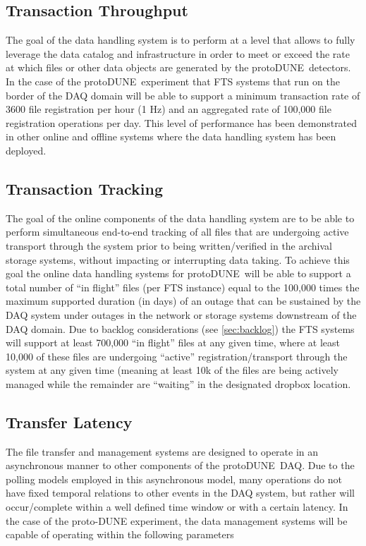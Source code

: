 \documentclass[pdftex,12pt,letter]{article}
\newcommand{\pd}{protoDUNE\ }
\begin{document}
\subsection{Transaction Throughput}

The goal of the data handling system is to perform at a level that allows to fully leverage the data
catalog and infrastructure in order to meet or exceed the rate at which files or other data
objects are generated by the \pd detectors.  In the case of the \pd experiment that FTS systems that run on
the border of the DAQ domain will be able to support a minimum transaction rate of 3600 file registration per hour (1 Hz)
and an aggregated rate of 100,000 file registration operations per day.  This level of performance has been demonstrated
in other online and offline systems where the data handling system has been deployed.

\subsection{Transaction Tracking}
The goal of the online components of the data handling system are to be able to perform simultaneous end-to-end tracking
of all files that are undergoing active transport through the system prior to being written/verified in the archival storage systems,
without impacting or interrupting data taking.  To achieve this goal the online data handling systems for \pd will be
able to support a total number of “in flight” files (per FTS instance) equal to the 100,000 times the maximum supported duration (in days)
of an outage that can be sustained by the DAQ system under outages in the network or storage systems downstream of the DAQ domain.
Due to backlog considerations (see \ref{sec:backlog}) the FTS systems will support at least 700,000 “in flight” files at any given time, where at least 10,000 of these
files are undergoing “active” registration/transport through the system at any given time (meaning at least 10k of the files are being actively
managed while the remainder are “waiting” in the designated dropbox location.

\subsection{Transfer Latency}
The file transfer and management systems are designed to operate in an asynchronous manner to other components of the \pd DAQ. 
Due to the polling models employed in this asynchronous model, many operations do not have fixed temporal relations to other events in the DAQ system,
but rather will occur/complete within a well defined time window or with a certain latency.  In the case of the proto-DUNE experiment,
the data management systems will be capable of operating within the following parameters
\end{document}
